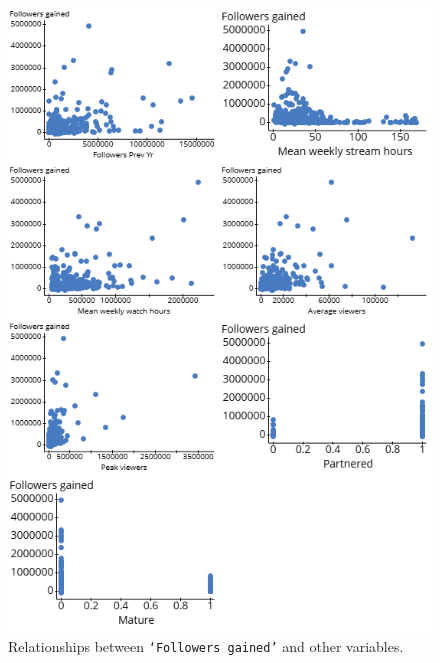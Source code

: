\documentclass[12pt]{article}
\begin{document}
\begin{figure}
  \centering
  \includegraphics[width=0.8\linewidth]{../StatCrunch_Results/follow_gain_scatter_matrix}
  \captionsetup{justification=centering, singlelinecheck=false, margin=2cm}
  \caption[Followers Gained Scatter Plot Matrix]{Relationships between \texttt{`Followers gained'} and other variables.}
  \label{fig:follow_gain_scatter_matrix}
\end{figure}


\end{document}
